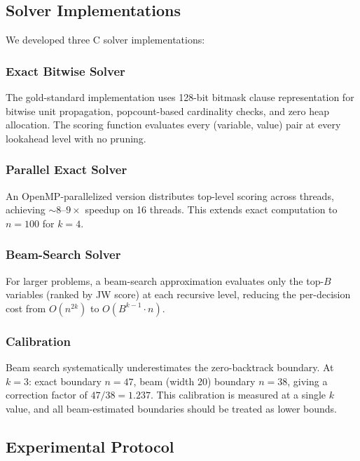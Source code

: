 \documentclass[11pt,a4paper]{article}
\begin{document}
\subsection{Solver Implementations}

We developed three C solver implementations:

\subsubsection{Exact Bitwise Solver}

The gold-standard implementation uses 128-bit bitmask clause representation for bitwise unit propagation, popcount-based cardinality checks, and zero heap allocation. The scoring function evaluates every (variable, value) pair at every lookahead level with no pruning.

\subsubsection{Parallel Exact Solver}

An OpenMP-parallelized version distributes top-level scoring across threads, achieving ${\sim}8$--$9\times$ speedup on 16 threads. This extends exact computation to $n = 100$ for $k = 4$.

\subsubsection{Beam-Search Solver}

For larger problems, a beam-search approximation evaluates only the top-$B$ variables (ranked by JW score) at each recursive level, reducing the per-decision cost from $O(n^{2k})$ to $O(B^{k-1} \cdot n)$.

\subsubsection{Calibration}

Beam search systematically underestimates the zero-backtrack boundary. At $k = 3$: exact boundary $n = 47$, beam (width 20) boundary $n = 38$, giving a correction factor of $47/38 = 1.237$. This calibration is measured at a single $k$ value, and all beam-estimated boundaries should be treated as lower bounds.

\subsection{Experimental Protocol}
\end{document}
